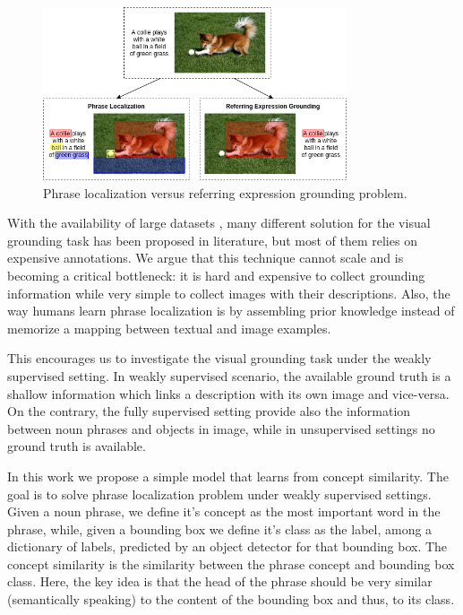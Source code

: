 \begin{figure}
  \centering
  \includegraphics[width=0.8\textwidth]{figures/dog-playing-with-ball.png}
  \caption[Phrase localization versus referring expression grounding
  problem]{Phrase localization versus referring expression grounding
  problem.}
  \label{fig:dog-playing-with-ball}
\end{figure}

With the availability of large datasets
\cite{plummer2015flickr30k,kazemzadeh2014referitgame}, many different
solution for the visual grounding task has been proposed in
literature, but most of them relies on expensive annotations. We argue
that this technique cannot scale and is becoming a critical bottleneck:
it is hard and expensive to collect grounding information while very
simple to collect images with their descriptions. Also, the way humans
learn phrase localization is by assembling prior knowledge instead of
memorize a mapping between textual and image examples.

This encourages us to investigate the visual grounding task under the
weakly supervised setting. In weakly supervised scenario, the
available ground truth is a shallow information which links a
description with its own image and vice-versa. On the contrary, the
fully supervised setting provide also the information between noun
phrases and objects in image, while in unsupervised settings no ground
truth is available.

In this work we propose a simple model that learns from concept
similarity. The goal is to solve phrase localization problem under
weakly supervised settings. Given a noun phrase, we define it's
concept as the most important word in the phrase, while, given a
bounding box we define it's class as the label, among a dictionary of
labels, predicted by an object detector for that bounding box. The
concept similarity is the similarity between the phrase concept and
bounding box class. Here, the key idea is that the head of the phrase
should be very similar (semantically speaking) to the content of the
bounding box and thus, to its class. 


